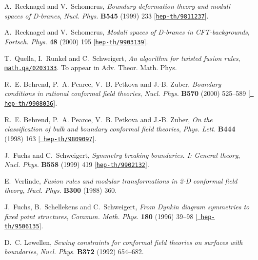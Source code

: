 \documentclass[12pt,a4paper]{article}
\begin{document}
\begin{thebibliography}{10}
A.~Recknagel and V.~Schomerus, {\it Boundary deformation theory and moduli
  spaces of {D}-branes},  {\em Nucl. Phys.} {\bf B545} (1999) 233
  [\href{http://arXiv.org/abs/hep-th/9811237}{{\tt hep-th/9811237}}].

A.~Recknagel and V.~Schomerus, {\it Moduli spaces of {D-branes} in
  {CFT-backgrounds}},  {\em Fortsch. Phys.} {\bf 48} (2000) 195
  [\href{http://arXiv.org/abs/hep-th/9903139}{{\tt hep-th/9903139}}].

T.~Quella, I.~Runkel and C.~Schweigert, {\it An algorithm for twisted fusion
  rules},  \href{http://arXiv.org/abs/math.qa/0203133}{{\tt math.qa/0203133}}.
  To appear in Adv. Theor. Math. Phys.

R.~E. Behrend, P.~A. Pearce, V.~B. Petkova and J.-B. Zuber, {\it Boundary
  conditions in rational conformal field theories},  {\em Nucl. Phys.} {\bf
  B570} (2000) 525--589 [\href{http://arXiv.org/abs/hep-th/9908036}{{\tt
  hep-th/9908036}}].

R.~E. Behrend, P.~A. Pearce, V.~B. Petkova and J.-B. Zuber, {\it On the
  classification of bulk and boundary conformal field theories},  {\em Phys.
  Lett.} {\bf B444} (1998) 163 [\href{http://arXiv.org/abs/hep-th/9809097}{{\tt
  hep-th/9809097}}].

J.~Fuchs and C.~Schweigert, {\it Symmetry breaking boundaries. {I: General}
  theory},  {\em Nucl. Phys.} {\bf B558} (1999) 419
  [\href{http://arXiv.org/abs/hep-th/9902132}{{\tt hep-th/9902132}}].

E.~Verlinde, {\it Fusion rules and modular transformations in 2-{D} conformal
  field theory},  {\em Nucl. Phys.} {\bf B300} (1988) 360.

J.~Fuchs, B.~Schellekens and C.~Schweigert, {\it From {Dynkin} diagram
  symmetries to fixed point structures},  {\em Commun. Math. Phys.} {\bf 180}
  (1996) 39--98 [\href{http://arXiv.org/abs/hep-th/9506135}{{\tt
  hep-th/9506135}}].

D.~C. Lewellen, {\it Sewing constraints for conformal field theories on
  surfaces with boundaries},  {\em Nucl. Phys.} {\bf B372} (1992) 654--682.


\end{thebibliography}
\end{document}
